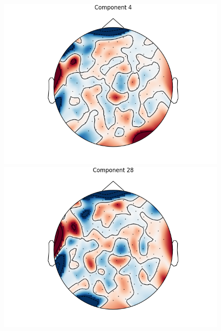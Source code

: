 \documentclass[fleqn,10pt]{wlscirep}
\begin{document}
\begin{figure}[h!]
  \begin{minipage}{0.31\textwidth}
    \centering\includegraphics[width=\linewidth]{max_act/4.png}
     \subcaption{}
  \end{minipage}
  \hspace*{\fill} %
  \begin{minipage}{0.31\textwidth}
    \includegraphics[width=\linewidth]{max_act/28.png}
     \subcaption{}
  \end{minipage}
   \hspace*{\fill} %
   \begin{minipage}{0.31\textwidth}

\end{minipage}
\end{figure}
\end{document}
